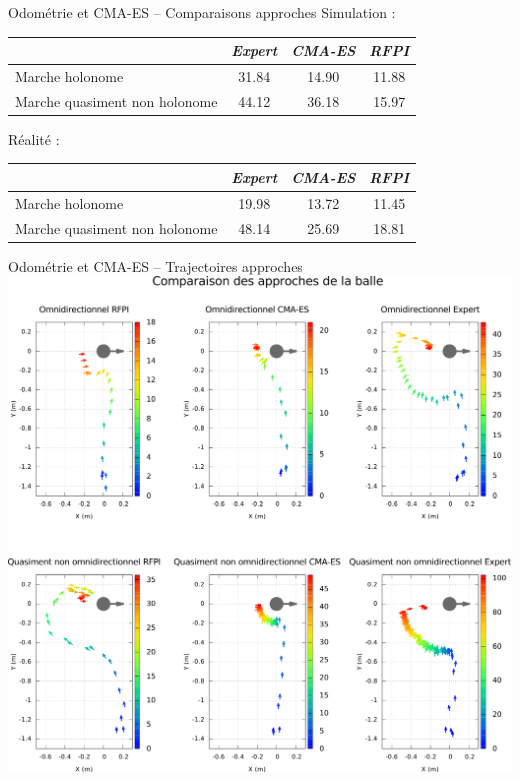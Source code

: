 \begin{frame}[noframenumbering]{Odométrie et CMA-ES -- Comparaisons approches}
    Simulation :\\
    \begin{tabular}{|l|c|c|c|}
        \hline
            & \textit{Expert} & \textit{CMA-ES} & \textit{RFPI} \\
        \hline
        Marche holonome     & 31.84      & 14.90  & 11.88      \\
        Marche quasiment non holonome   & 44.12      & 36.18  & 15.97 \\
        \hline
    \end{tabular}
    \vspace{4em}
    \newline
    Réalité :\\
    \begin{tabular}{|l|c|c|c|}
        \hline
            & \textit{Expert} & \textit{CMA-ES} & \textit{RFPI} \\
        \hline
        Marche holonome   & 19.98      & 13.72  & 11.45      \\
        Marche quasiment non holonome & 48.14      & 25.69  & 18.81 \\
        \hline
    \end{tabular}
\end{frame}

\begin{frame}[noframenumbering]{Odométrie et CMA-ES -- Trajectoires approches}
    \centering
    \includegraphics[type=pdf,ext=.pdf,read=.pdf,width=0.65\linewidth]{../plot/OdometryCMAES/robotTrajs}
\end{frame}

